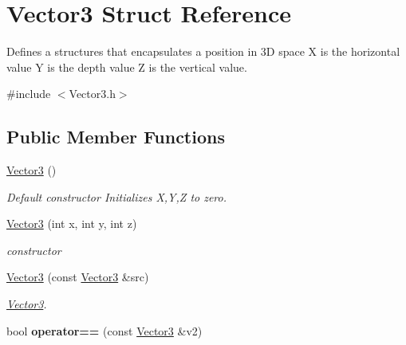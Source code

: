 \hypertarget{structVector3}{\section{Vector3 Struct Reference}
\label{structVector3}
}


Defines a structures that encapsulates a position in 3\-D space X is the horizontal value Y is the depth value Z is the vertical value.  




{\ttfamily \#include $<$Vector3.\-h$>$}

\subsection*{Public Member Functions}
\begin{DoxyCompactItemize}
\item 
\hypertarget{structVector3_a0f49191f7e001e7f7ae1cb49522118b4}{\hyperlink{structVector3_a0f49191f7e001e7f7ae1cb49522118b4}{Vector3} ()}\label{structVector3_a0f49191f7e001e7f7ae1cb49522118b4}

\begin{DoxyCompactList}\small\item\em Default constructor Initializes X,Y,Z to zero. \end{DoxyCompactList}\item 
\hyperlink{structVector3_af7339592cdacffdfc39566133bd285d0}{Vector3} (int x, int y, int z)
\begin{DoxyCompactList}\small\item\em constructor \end{DoxyCompactList}\item 
\hyperlink{structVector3_a48b47d99e6445850a61e57eb850a5a4f}{Vector3} (const \hyperlink{structVector3}{Vector3} \&src)
\begin{DoxyCompactList}\small\item\em \hyperlink{structVector3}{Vector3}. \end{DoxyCompactList}\item 
\hypertarget{structVector3_a426560c251dee5150b4a951bbabd0a0f}{bool {\bfseries operator==} (const \hyperlink{structVector3}{Vector3} \&v2)}\label{structVector3_a426560c251dee5150b4a951bbabd0a0f}

\end{DoxyCompactItemize}
